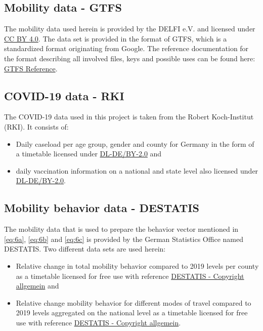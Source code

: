 \subsection{Mobility data - GTFS}
The mobility data used herein is provided by the DELFI e.V. and licensed under \href{https://creativecommons.org/licenses/by/4.0/deed.de}{CC BY 4.0}.\cite{delfie.v.OpenDataOPNV2021}
The data set is provided in the format of GTFS, which is a standardized format originating from Google. The reference documentation for the format describing all involved files, keys and possible uses can be found here: \href{https://developers.google.com/transit/gtfs/reference}{GTFS Reference}.

\subsection{COVID-19 data - RKI}
The COVID-19 data used in this project is taken from the Robert Koch-Institut (RKI). It consists of:
\begin{itemize}
	\item Daily caseload per age group, gender and county for Germany in the form of a timetable \cite{robertkoch-institutrkiRKICOVID192021} licensed under \href{https://www.govdata.de/dl-de/by-2-0}{DL-DE/BY-2.0} and
	\item daily vaccination information on a national and state level \cite{robertkoch-institutrkiRKICoronavirusSARSCoV22021} also licensed under \href{https://www.govdata.de/dl-de/by-2-0}{DL-DE/BY-2.0}.
\end{itemize}

\subsection{Mobility behavior data - DESTATIS}
The mobility data that is used to prepare the behavior vector mentioned in \eqref{eq:6a}, \eqref{eq:6b} and \eqref{eq:6c} is provided by the German Statistics Office named DESTATIS. Two different data sets are used herein:
\begin{itemize}
	\item Relative change in total mobility behavior compared to 2019 levels per county as a timetable \cite{statistischesbundesamtdestatisVeranderungsrateMobilitatGgu2021} licensed for free use with reference \href{https://www.destatis.de/DE/Service/Impressum/copyright-allgemein.html}{DESTATIS - Copyright allgemein} and
	\item Relative change mobility behavior for different modes of travel compared to 2019 levels aggregated on the national level as a timetable \cite{statistischesbundesamtdestatisVerkehrsmittelImFernverkehr2021} licensed for free use with reference \href{https://www.destatis.de/DE/Service/Impressum/copyright-allgemein.html}{DESTATIS - Copyright allgemein}.
\end{itemize}
